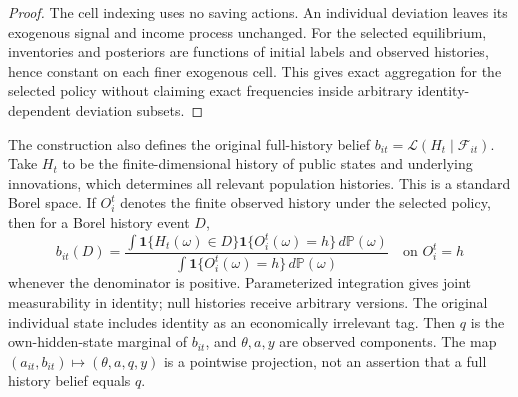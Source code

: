 \documentclass[11pt]{article}
\newcommand{\ind}{\mathbf1}
\begin{document}
\begin{proof}
The cell indexing uses no saving actions. An individual deviation leaves its exogenous signal and income process unchanged. For the selected equilibrium, inventories and posteriors are functions of initial labels and observed histories, hence constant on each finer exogenous cell. This gives exact aggregation for the selected policy without claiming exact frequencies inside arbitrary identity-dependent deviation subsets.
\end{proof}

The construction also defines the original full-history belief
$b_{it}=\mathcal L(H_t\mid\mathcal F_{it})$. Take $H_t$ to be the finite-dimensional history of public states and underlying innovations, which determines all relevant population histories. This is a standard Borel space. If $O_i^t$ denotes the finite observed history under the selected policy, then for a Borel history event $D$,
\[
 b_{it}(D)=
 \frac{\int\ind\{H_t(\omega)\in D\}\ind\{O_i^t(\omega)=h\}\,d\mathbb P(\omega)}
 {\int\ind\{O_i^t(\omega)=h\}\,d\mathbb P(\omega)}
 \quad\text{on }O_i^t=h
\]
whenever the denominator is positive. Parameterized integration gives joint measurability in identity; null histories receive arbitrary versions. The original individual state includes identity as an economically irrelevant tag. Then $q$ is the own-hidden-state marginal of $b_{it}$, and $\theta,a,y$ are observed components. The map $(a_{it},b_{it})\mapsto(\theta,a,q,y)$ is a pointwise projection, not an assertion that a full history belief equals $q$.
\end{document}
